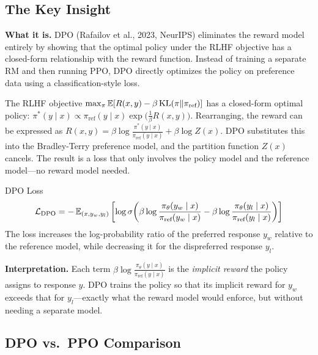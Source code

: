 \subsection{The Key Insight}

\textbf{What it is.} DPO (Rafailov et al., 2023, NeurIPS) eliminates the reward model entirely by showing that the optimal policy under the RLHF objective has a closed-form relationship with the reward function. Instead of training a separate RM and then running PPO, DPO directly optimizes the policy on preference data using a classification-style loss.

\begin{keyinsight}
The RLHF objective $\max_\pi \operatorname{\mathbb{E}}[R(x,y) - \beta \operatorname{KL}(\pi \| \pi_{\text{ref}})]$ has a closed-form optimal policy: $\pi^*(y \mid x) \propto \pi_{\text{ref}}(y \mid x) \exp\!\big(\frac{1}{\beta}R(x,y)\big)$. Rearranging, the reward can be expressed as $R(x,y) = \beta \log \frac{\pi^*(y \mid x)}{\pi_{\text{ref}}(y \mid x)} + \beta \log Z(x)$. DPO substitutes this into the Bradley-Terry preference model, and the partition function $Z(x)$ cancels. The result is a loss that only involves the policy model and the reference model---no reward model needed.
\end{keyinsight}

\begin{mathresult}{DPO Loss}
\begin{equation}
\mathcal{L}_{\text{DPO}} = -\operatorname{\mathbb{E}}_{(x, y_w, y_l)}\left[\log \sigma\!\left(\beta \log \frac{\pi_\theta(y_w \mid x)}{\pi_{\text{ref}}(y_w \mid x)} - \beta \log \frac{\pi_\theta(y_l \mid x)}{\pi_{\text{ref}}(y_l \mid x)}\right)\right]
\end{equation}
The loss increases the log-probability ratio of the preferred response $y_w$ relative to the reference model, while decreasing it for the dispreferred response $y_l$.
\end{mathresult}

\textbf{Interpretation.} Each term $\beta \log \frac{\pi_\theta(y \mid x)}{\pi_{\text{ref}}(y \mid x)}$ is the \textit{implicit reward} the policy assigns to response $y$. DPO trains the policy so that its implicit reward for $y_w$ exceeds that for $y_l$---exactly what the reward model would enforce, but without needing a separate model.

\subsection{DPO vs.\ PPO Comparison}

